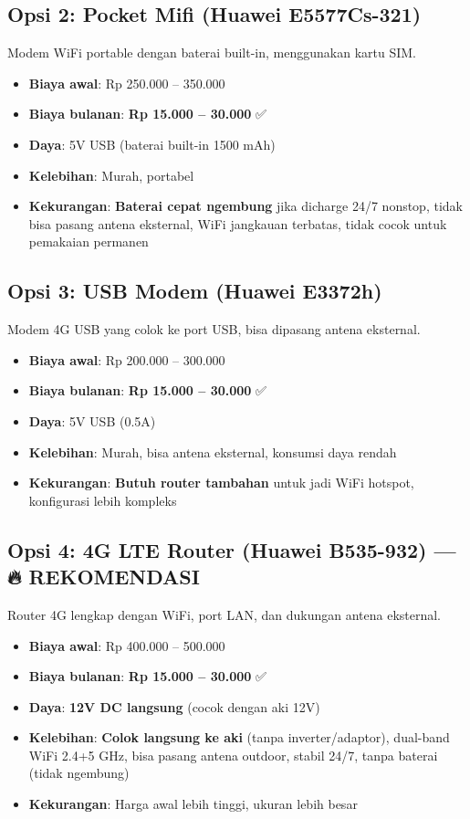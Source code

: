 \documentclass[12pt,a4paper,oneside]{report}
\begin{document}
\subsection{Opsi 2: Pocket Mifi (Huawei E5577Cs-321)}

Modem WiFi portable dengan baterai built-in, menggunakan kartu SIM.

\begin{itemize}
    \item \textbf{Biaya awal}: Rp 250.000 -- 350.000
    \item \textbf{Biaya bulanan}: \textbf{Rp 15.000 -- 30.000} ✅
    \item \textbf{Daya}: 5V USB (baterai built-in 1500 mAh)
    \item \textbf{Kelebihan}: Murah, portabel
    \item \textbf{Kekurangan}: \textbf{Baterai cepat ngembung} jika dicharge 24/7 nonstop, tidak bisa pasang antena eksternal, WiFi jangkauan terbatas, tidak cocok untuk pemakaian permanen
\end{itemize}

\subsection{Opsi 3: USB Modem (Huawei E3372h)}

Modem 4G USB yang colok ke port USB, bisa dipasang antena eksternal.

\begin{itemize}
    \item \textbf{Biaya awal}: Rp 200.000 -- 300.000
    \item \textbf{Biaya bulanan}: \textbf{Rp 15.000 -- 30.000} ✅
    \item \textbf{Daya}: 5V USB (0.5A)
    \item \textbf{Kelebihan}: Murah, bisa antena eksternal, konsumsi daya rendah
    \item \textbf{Kekurangan}: \textbf{Butuh router tambahan} untuk jadi WiFi hotspot, konfigurasi lebih kompleks
\end{itemize}

\subsection{Opsi 4: 4G LTE Router (Huawei B535-932) — 🔥 REKOMENDASI}

Router 4G lengkap dengan WiFi, port LAN, dan dukungan antena eksternal.

\begin{itemize}
    \item \textbf{Biaya awal}: Rp 400.000 -- 500.000
    \item \textbf{Biaya bulanan}: \textbf{Rp 15.000 -- 30.000} ✅
    \item \textbf{Daya}: \textbf{12V DC langsung} (cocok dengan aki 12V)
    \item \textbf{Kelebihan}: \textbf{Colok langsung ke aki} (tanpa inverter/adaptor), dual-band WiFi 2.4+5 GHz, bisa pasang antena outdoor, stabil 24/7, tanpa baterai (tidak ngembung)
    \item \textbf{Kekurangan}: Harga awal lebih tinggi, ukuran lebih besar
\end{itemize}
\end{document}
